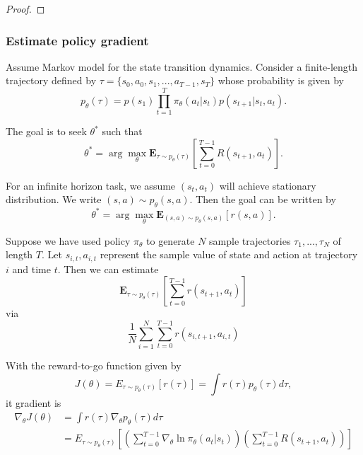 \begin{refsection}
\begin{proof}
\end{proof}


\subsubsection{Estimate policy gradient}

\begin{definition}
	Assume Markov model for the state transition dynamics. Consider a finite-length trajectory defined by $\tau = \{s_0,a_0, s_1,...,a_{T-1}, s_T\}$ whose probability is given by
	$$p_\theta(\tau) = p(s_1)\prod_{t=1}^T \pi_{\theta}(a_t|s_t)p(s_{t+1}|s_t,a_t).$$
	
	The goal is to seek $\theta^*$ such that
	$$\theta^* = \arg\max_{\theta} \mathbf{E}_{\tau\sim p_\theta(\tau)} [\sum_{t=0}^{T-1} R(s_{t+1},a_t)].$$	
	

	For an infinite horizon task, we assume $(s_t,a_t)$ will achieve stationary distribution. We write $(s,a)\sim p_\theta(s,a)$. Then the goal can be written by
	$$\theta^* = \arg\max_{\theta} \mathbf{E}_{(s,a)\sim p_\theta(s,a)}[r(s,a)].$$	
\end{definition}

\begin{remark}
	Suppose we have used policy $\pi_{\theta}$ to generate $N$ sample trajectories $\tau_1,...,\tau_N$ of length $T$. Let $s_{i,t}, a_{i,t}$ represent the sample value of state and action at trajectory $i$ and time $t$. Then we can estimate 
	$$\mathbf{E}_{\tau\sim p_\theta(\tau)} [\sum_{t=0}^{T-1} r(s_{t+1},a_t)]$$
	via
	$$\frac{1}{N}\sum_{i=1}^N\sum_{t=0}^{T-1} r(s_{i,t+1}, a_{i,t})$$
\end{remark}


\begin{theorem}
	With the reward-to-go function given by
	$$J(\theta) = E_{\tau\sim p_\theta(\tau)}[r(\tau)] = \int r(\tau)p_\theta(\tau) d\tau ,$$
	it gradient is 
	\begin{align*}
	\nabla_{\theta}J(\theta) &= \int r(\tau)\nabla_{\theta}   p_\theta(\tau) d\tau \\
	&= E_{\tau\sim p_\theta(\tau)}[(\sum_{t=0}^{T-1} \nabla_{\theta} \ln \pi_{\theta}(a_t|s_t))(\sum_{t=0}^{T-1}R(s_{t+1},a_t))] 
	\end{align*}
	

\end{theorem}
\end{refsection}
